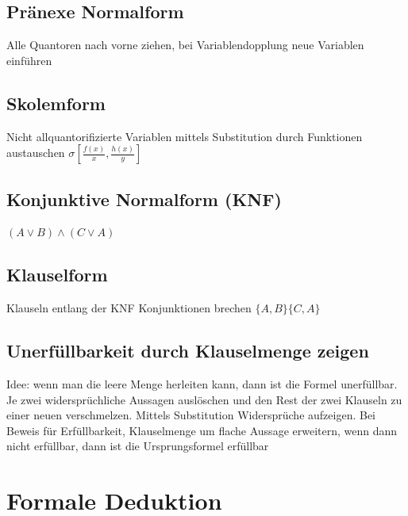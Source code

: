 \documentclass{article}
\begin{document}
		\subsection{Pränexe Normalform}
			Alle Quantoren nach vorne ziehen, bei Variablendopplung neue Variablen einführen
		\subsection{Skolemform}
			Nicht allquantorifizierte Variablen mittels Substitution durch Funktionen austauschen 
			$\sigma[\frac{f(x)}{x}, \frac{h(x)}{y}]$
		\subsection{Konjunktive Normalform (KNF)}
			$(A\lor B)\land (C \lor A)$	
		\subsection{Klauselform}
			Klauseln entlang der KNF Konjunktionen brechen \newline
			$\{A, B\}\{C, A\}$
		\subsection{Unerfüllbarkeit durch Klauselmenge zeigen}
			Idee: wenn man die leere Menge herleiten kann, dann ist die Formel unerfüllbar. \newline
			Je zwei widersprüchliche Aussagen auslöschen und den Rest der zwei Klauseln zu einer neuen verschmelzen. Mittels Substitution Widersprüche aufzeigen. \newline
			Bei Beweis für Erfüllbarkeit, Klauselmenge um flache Aussage erweitern, wenn dann nicht erfüllbar, dann ist die Ursprungsformel erfüllbar
	\section{Formale Deduktion}
\end{document}
